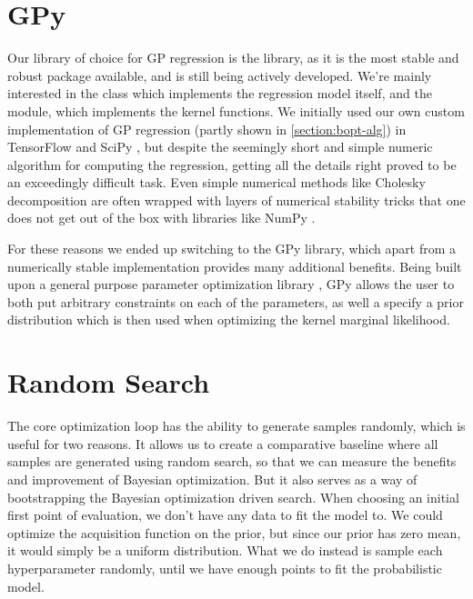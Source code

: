 \section{GPy}

Our library of choice for GP regression is the \cite{gpy2014} library, as it is the most stable and robust package available, and is still being actively developed. We're mainly interested in the  class which implements the regression model itself, and the  module, which implements the kernel functions. We initially used our own custom implementation of GP regression (partly shown in \autoref{section:bopt-alg}) in TensorFlow \citep{tensorflow2015-whitepaper} and SciPy \citep{scipy}, but despite the seemingly short and simple numeric algorithm for computing the regression, getting all the details right proved to be an exceedingly difficult task. Even simple numerical methods like Cholesky decomposition are often wrapped with layers of numerical stability tricks that one does not get out of the box with libraries like NumPy \citep{numpy}.

For these reasons we ended up switching to the GPy library, which apart from a numerically stable implementation provides many additional benefits. Being built upon a general purpose parameter optimization library \cite{paramz}, GPy allows the user to both put arbitrary constraints on each of the parameters, as well a specify a prior distribution which is then used when optimizing the kernel marginal likelihood.

\section{Random Search}

The core optimization loop has the ability to generate samples randomly, which is useful for two reasons. It allows us to create a comparative baseline where all samples are generated using random search, so that we can measure the benefits and improvement of Bayesian optimization. But it also serves as a way of bootstrapping the Bayesian optimization driven search. When choosing an initial first point of evaluation, we don't have any data to fit the model to. We could optimize the acquisition function on the prior, but since our prior has zero mean, it would simply be a uniform distribution. What we do instead is sample each hyperparameter randomly, until we have enough points to fit the probabilistic model.

